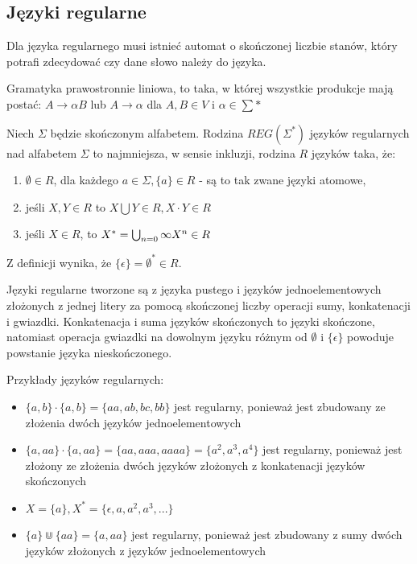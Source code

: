  

\subsection{Języki regularne}
Dla języka regularnego musi istnieć automat o skończonej liczbie stanów, który potrafi zdecydować czy dane słowo należy do języka.

\begin{pojecie}
	Gramatyka prawostronnie liniowa, to taka, w której wszystkie produkcje mają postać: $ A \rightarrow \alpha B$ lub $ A \rightarrow \alpha$ dla $ A, B \in V$ i $ \alpha \in \sum *$ 
\end{pojecie}

\begin{definicja}
	Niech $\Sigma$ będzie skończonym alfabetem. Rodzina $REG(\Sigma^{*})$ języków regularnych nad alfabetem $\Sigma$ to najmniejsza, w sensie inkluzji, rodzina $R$ języków taka, że:
	\begin{enumerate}
		\item $\emptyset \in R$, dla każdego $a \in \Sigma, \{a\} \in R$ - są to tak zwane języki atomowe,
		\item jeśli $X, Y \in R$ to $X\bigcup Y\in R, X \cdot Y \in R$
		\item jeśli $X \in R$, to $X^{*} = \bigcup_{n=0}{\infty} \space X^{n} \in R$
	\end{enumerate}
	Z definicji wynika, że $\{ \epsilon \} = \emptyset^{*} \in R$.
\end{definicja}
Języki regularne tworzone są z języka pustego i języków jednoelementowych złożonych z jednej litery za pomocą skończonej liczby operacji sumy, konkatenacji i gwiazdki.
Konkatenacja i suma języków skończonych to języki skończone, natomiast operacja gwiazdki na dowolnym języku różnym od $\emptyset$ i $ \{\epsilon \} $ powoduje powstanie języka nieskończonego.

\begin{przyklad}
	Przykłady języków regularnych: 
	\begin{itemize}
		\item $ \{a,b\} \cdot \{a,b\} = \{aa, ab, bc, bb\}$ jest regularny, ponieważ jest zbudowany ze złożenia dwóch języków jednoelementowych
		\item $ \{a,aa\} \cdot \{a,aa\} = \{aa, aaa, aaaa\}=\{a^{2}, a^{3}, a^{4}\}$ jest regularny, ponieważ jest złożony ze złożenia dwóch języków złożonych z konkatenacji języków skończonych
		\item $ X=\{a\}, X^{*}=\{\epsilon, a, a^{2}, a^{3}, ...\} $
		\item $ \{a \}  \Cup  \{aa\} 
		= \{a, aa\} $ jest regularny, ponieważ jest zbudowany z sumy dwóch języków złożonych z języków jednoelementowych
	\end{itemize}
\end{przyklad}

